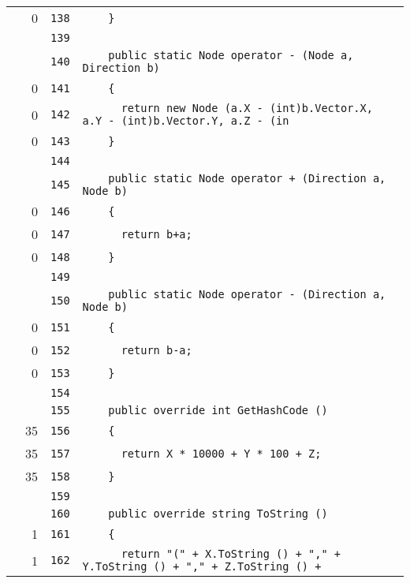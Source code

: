 \documentclass[a4paper,10pt]{article}
\begin{document}
\begin{longtable}[l]{lrrl}
\cellcolor{red} & 0 & \verb~138~ & \verb~    }~\\
\cellcolor{gray} &  & \verb~139~ & \verb~~\\
\cellcolor{gray} &  & \verb~140~ & \verb~    public static Node operator - (Node a, Direction b)~\\
\cellcolor{red} & 0 & \verb~141~ & \verb~    {~\\
\cellcolor{red} & 0 & \verb~142~ & \verb~      return new Node (a.X - (int)b.Vector.X, a.Y - (int)b.Vector.Y, a.Z - (in~\\
\cellcolor{red} & 0 & \verb~143~ & \verb~    }~\\
\cellcolor{gray} &  & \verb~144~ & \verb~~\\
\cellcolor{gray} &  & \verb~145~ & \verb~    public static Node operator + (Direction a, Node b)~\\
\cellcolor{red} & 0 & \verb~146~ & \verb~    {~\\
\cellcolor{red} & 0 & \verb~147~ & \verb~      return b+a;~\\
\cellcolor{red} & 0 & \verb~148~ & \verb~    }~\\
\cellcolor{gray} &  & \verb~149~ & \verb~~\\
\cellcolor{gray} &  & \verb~150~ & \verb~    public static Node operator - (Direction a, Node b)~\\
\cellcolor{red} & 0 & \verb~151~ & \verb~    {~\\
\cellcolor{red} & 0 & \verb~152~ & \verb~      return b-a;~\\
\cellcolor{red} & 0 & \verb~153~ & \verb~    }~\\
\cellcolor{gray} &  & \verb~154~ & \verb~~\\
\cellcolor{gray} &  & \verb~155~ & \verb~    public override int GetHashCode ()~\\
\cellcolor{green} & 35 & \verb~156~ & \verb~    {~\\
\cellcolor{green} & 35 & \verb~157~ & \verb~      return X * 10000 + Y * 100 + Z;~\\
\cellcolor{green} & 35 & \verb~158~ & \verb~    }~\\
\cellcolor{gray} &  & \verb~159~ & \verb~~\\
\cellcolor{gray} &  & \verb~160~ & \verb~    public override string ToString ()~\\
\cellcolor{green} & 1 & \verb~161~ & \verb~    {~\\
\cellcolor{green} & 1 & \verb~162~ & \verb~      return "(" + X.ToString () + "," + Y.ToString () + "," + Z.ToString () +~\\

\end{longtable}
\end{document}
